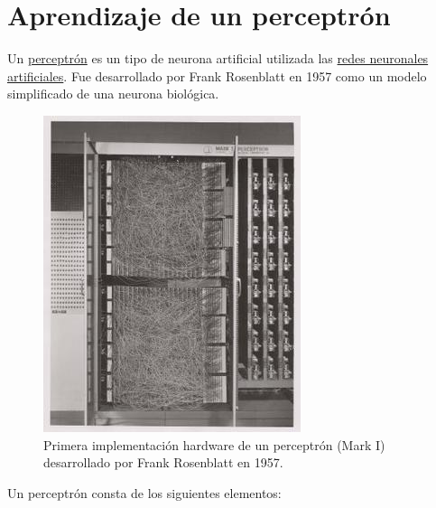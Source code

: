 \documentclass[
  a4paper,
]{scrreport}
\begin{document}

\chapter{Aprendizaje de un
perceptrón}\label{aprendizaje-de-un-perceptruxf3n}

Un \href{https://es.wikipedia.org/wiki/Perceptr\%C3\%B3n}{perceptrón} es
un tipo de neurona artificial utilizada las
\href{https://es.wikipedia.org/wiki/Red_neuronal_artificial}{redes
neuronales artificiales}. Fue desarrollado por Frank Rosenblatt en 1957
como un modelo simplificado de una neurona biológica.

\begin{figure}[H]

{\centering \includegraphics{img/perceptron/perceptron-mark-1.jpeg}

}

\caption{Primera implementación hardware de un perceptrón (Mark I)
desarrollado por Frank Rosenblatt en 1957.}

\end{figure}%

Un perceptrón consta de los siguientes elementos:
\end{document}
